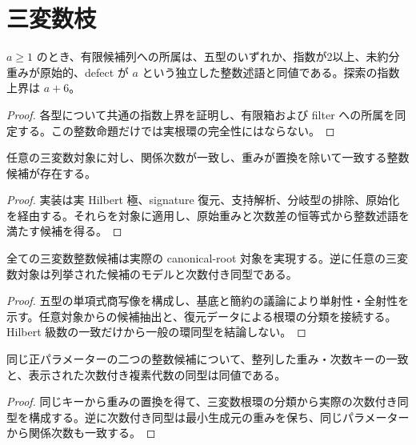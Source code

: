 \section{三変数枝}

\begin{theorem}[三変数の完全な整数探索]
\label{thm:ternary-enum}
\leanok
$a\geq1$ のとき、有限候補列への所属は、五型のいずれか、指数が2以上、未約分重みが原始的、defect が $a$ という独立した整数述語と同値である。探索の指数上界は $a+6$。
\end{theorem}
\begin{proof}
\leanok
{}
各型について共通の指数上界を証明し、有限箱および filter への所属を同定する。この整数命題だけでは実根環の完全性にはならない。
\end{proof}

\begin{theorem}[任意の三変数対象から五型への帰着]
\label{thm:ternary-reduction}
\leanok
任意の三変数対象に対し、関係次数が一致し、重みが置換を除いて一致する整数候補が存在する。
\end{theorem}
\begin{proof}
\leanok
{}
実装は実 Hilbert 極、signature 復元、支持解析、分岐型の排除、原始化を経由する。それらを対象に適用し、原始重みと次数差の恒等式から整数述語を満たす候補を得る。
\end{proof}

\begin{theorem}[三変数の実環実現と完全性]
\label{thm:ternary-model}
\leanok
全ての三変数整数候補は実際の canonical-root 対象を実現する。逆に任意の三変数対象は列挙された候補のモデルと次数付き同型である。
\end{theorem}
\begin{proof}
\leanok
{}
五型の単項式商写像を構成し、基底と簡約の議論により単射性・全射性を示す。任意対象からの候補抽出と、復元データによる根環の分類を接続する。Hilbert 級数の一致だけから一般の環同型を結論しない。
\end{proof}

\begin{theorem}[三変数キーと実モデルの同型]
\label{thm:key}
\leanok
同じ正パラメーターの二つの整数候補について、整列した重み・次数キーの一致と、表示された次数付き複素代数の同型は同値である。
\end{theorem}
\begin{proof}
\leanok
{}
同じキーから重みの置換を得て、三変数根環の分類から実際の次数付き同型を構成する。逆に次数付き同型は最小生成元の重みを保ち、同じパラメーターから関係次数も一致する。
\end{proof}

